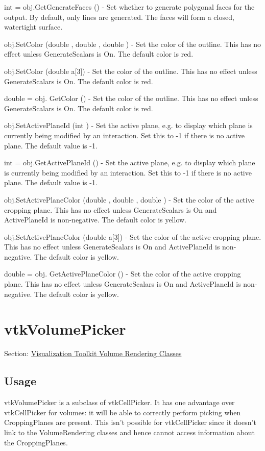 \begin{DoxyItemize}
\item {\ttfamily int = obj.\-Get\-Generate\-Faces ()} -\/ Set whether to generate polygonal faces for the output. By default, only lines are generated. The faces will form a closed, watertight surface.  
\item {\ttfamily obj.\-Set\-Color (double , double , double )} -\/ Set the color of the outline. This has no effect unless Generate\-Scalars is On. The default color is red.  
\item {\ttfamily obj.\-Set\-Color (double a\mbox{[}3\mbox{]})} -\/ Set the color of the outline. This has no effect unless Generate\-Scalars is On. The default color is red.  
\item {\ttfamily double = obj. Get\-Color ()} -\/ Set the color of the outline. This has no effect unless Generate\-Scalars is On. The default color is red.  
\item {\ttfamily obj.\-Set\-Active\-Plane\-Id (int )} -\/ Set the active plane, e.\-g. to display which plane is currently being modified by an interaction. Set this to -\/1 if there is no active plane. The default value is -\/1.  
\item {\ttfamily int = obj.\-Get\-Active\-Plane\-Id ()} -\/ Set the active plane, e.\-g. to display which plane is currently being modified by an interaction. Set this to -\/1 if there is no active plane. The default value is -\/1.  
\item {\ttfamily obj.\-Set\-Active\-Plane\-Color (double , double , double )} -\/ Set the color of the active cropping plane. This has no effect unless Generate\-Scalars is On and Active\-Plane\-Id is non-\/negative. The default color is yellow.  
\item {\ttfamily obj.\-Set\-Active\-Plane\-Color (double a\mbox{[}3\mbox{]})} -\/ Set the color of the active cropping plane. This has no effect unless Generate\-Scalars is On and Active\-Plane\-Id is non-\/negative. The default color is yellow.  
\item {\ttfamily double = obj. Get\-Active\-Plane\-Color ()} -\/ Set the color of the active cropping plane. This has no effect unless Generate\-Scalars is On and Active\-Plane\-Id is non-\/negative. The default color is yellow.  
\end{DoxyItemize}\hypertarget{vtkvolumerendering_vtkvolumepicker}{}\section{vtk\-Volume\-Picker}\label{vtkvolumerendering_vtkvolumepicker}
Section\-: \hyperlink{sec_vtkvolumerendering}{Visualization Toolkit Volume Rendering Classes} \hypertarget{vtkwidgets_vtkxyplotwidget_Usage}{}\subsection{Usage}\label{vtkwidgets_vtkxyplotwidget_Usage}
vtk\-Volume\-Picker is a subclass of vtk\-Cell\-Picker. It has one advantage over vtk\-Cell\-Picker for volumes\-: it will be able to correctly perform picking when Cropping\-Planes are present. This isn't possible for vtk\-Cell\-Picker since it doesn't link to the Volume\-Rendering classes and hence cannot access information about the Cropping\-Planes.

